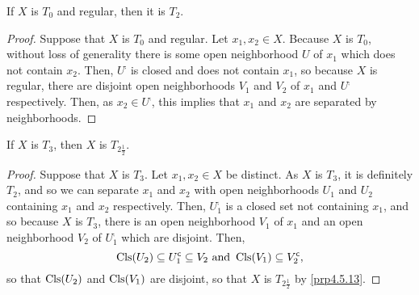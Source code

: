 \begin{prp}\label{prp4.6.53}
If $X$ is $T_0$ and regular, then it is $T_2$.
\begin{proof}
Suppose that $X$ is $T_0$ and regular.  Let $x_1,x_2\in X$.  Because $X$ is $T_0$, without loss of generality there is some open neighborhood $U$ of $x_1$ which does not contain $x_2$.  Then, $U^{\comp}$ is closed and does not contain $x_1$, so because $X$ is regular, there are disjoint open neighborhoods $V_1$ and $V_2$ of $x_1$ and $U^{\comp}$ respectively.  Then, as $x_2\in U^{\comp}$, this implies that $x_1$ and $x_2$ are separated by neighborhoods.
\end{proof}
\end{prp}
\begin{prp}
If $X$ is $T_3$, then $X$ is $T_{2\frac{1}{2}}$.
\begin{proof}
Suppose that $X$ is $T_3$.  Let $x_1,x_2\in X$ be distinct.  As $X$ is $T_3$, it is definitely $T_2$, and so we can separate $x_1$ and $x_2$ with open neighborhoods $U_1$ and $U_2$ containing $x_1$ and $x_2$ respectively.  Then, $U_1^{\comp}$ is a closed set not containing $x_1$, and so because $X$ is $T_3$, there is an open neighborhood $V_1$ of $x_1$ and an open neighborhood $V_2$ of $U_1^{\comp}$ which are disjoint.  Then,
\begin{equation}
\operatorname{Cls} (U_2)\subseteq U_1^{\mathsf{c}}\subseteq V_2\text{ and }\operatorname{Cls} (V_1)\subseteq V_2^{\mathsf{c}},
\end{equation}
so that $\operatorname{Cls} (U_2)$ and $\operatorname{Cls} (V_1)$ are disjoint, so that $X$ is $T_{2\frac{1}{2}}$ by \cref{prp4.5.13}.
\end{proof}
\end{prp}
